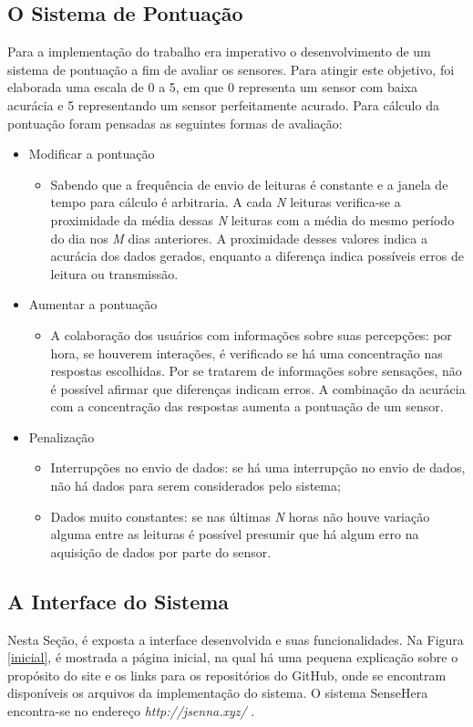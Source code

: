 \subsection{O Sistema de Pontuação}
\label{subsec:pontuacao}
\null \quad Para a implementação do trabalho era imperativo o desenvolvimento de um sistema de pontuação a fim de avaliar os sensores. Para atingir este objetivo, foi elaborada uma escala de 0 a 5, em que 0 representa um sensor com baixa acurácia e 5 representando um sensor perfeitamente acurado. Para cálculo da pontuação foram pensadas as seguintes formas de avaliação:
\begin{itemize}
  \item Modificar a pontuação
    \begin{itemize}
      \item Sabendo que a frequência de envio de leituras é constante e a janela de tempo para cálculo é arbitraria. A cada \textit{N} leituras verifica-se a proximidade da média dessas \textit{N} leituras com a média do mesmo período do dia nos \textit{M} dias anteriores. A proximidade desses valores indica a acurácia dos dados gerados, enquanto a diferença indica possíveis erros de leitura ou transmissão.
    \end{itemize}
  \item Aumentar a pontuação
  \begin{itemize}
    \item A colaboração dos usuários com informações sobre suas percepções: por hora, se houverem interações, é verificado se há uma concentração nas respostas escolhidas. Por se tratarem de informações sobre sensações, não é possível afirmar que diferenças indicam erros. A combinação da acurácia com a concentração das respostas aumenta a pontuação de um sensor.
  \end{itemize}
  \item Penalização
    \begin{itemize}
      \item Interrupções no envio de dados: se há uma interrupção no envio de dados, não há dados para serem considerados pelo sistema;
      \item Dados muito constantes: se nas últimas \textit{N} horas não houve variação alguma entre as leituras é possível presumir que há algum erro na aquisição de dados por parte do sensor.
    \end{itemize}
\end{itemize}

\subsection{A Interface do Sistema}
\null \quad Nesta Seção, é exposta a interface desenvolvida e suas funcionalidades. Na Figura \ref{inicial},
é mostrada a página inicial, na qual há uma pequena explicação sobre o propósito do site e os links para os repositórios do GitHub, onde se encontram disponíveis os arquivos da implementação do sistema. O sistema SenseHera encontra-se no endereço \textit{http://jsenna.xyz/} .


